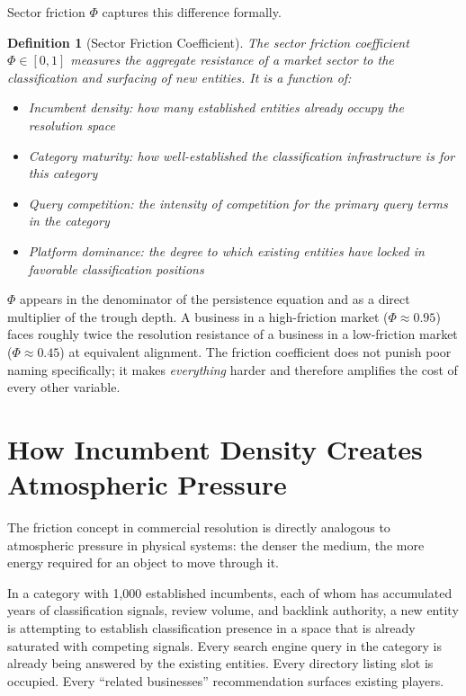 \documentclass[12pt, openany]{book}
\theoremstyle{thmstyle}
\theoremstyle{defstyle}
\newtheorem{definition}{Definition}[chapter]
\begin{document}
Sector friction $\Phi$ captures this difference formally.

\begin{definition}[Sector Friction Coefficient]
The sector friction coefficient $\Phi \in [0, 1]$ measures the aggregate resistance of a market sector to the classification and surfacing of new entities. It is a function of:
\begin{itemize}[leftmargin=1.5em]
  \item Incumbent density: how many established entities already occupy the resolution space
  \item Category maturity: how well-established the classification infrastructure is for this category
  \item Query competition: the intensity of competition for the primary query terms in the category
  \item Platform dominance: the degree to which existing entities have locked in favorable classification positions
\end{itemize}
\end{definition}

$\Phi$ appears in the denominator of the persistence equation and as a direct multiplier of the trough depth. A business in a high-friction market ($\Phi \approx 0.95$) faces roughly twice the resolution resistance of a business in a low-friction market ($\Phi \approx 0.45$) at equivalent alignment. The friction coefficient does not punish poor naming specifically; it makes \textit{everything} harder and therefore amplifies the cost of every other variable.

\section{How Incumbent Density Creates Atmospheric Pressure}

The friction concept in commercial resolution is directly analogous to atmospheric pressure in physical systems: the denser the medium, the more energy required for an object to move through it.

In a category with 1,000 established incumbents, each of whom has accumulated years of classification signals, review volume, and backlink authority, a new entity is attempting to establish classification presence in a space that is already saturated with competing signals. Every search engine query in the category is already being answered by the existing entities. Every directory listing slot is occupied. Every ``related businesses'' recommendation surfaces existing players.
\end{document}
